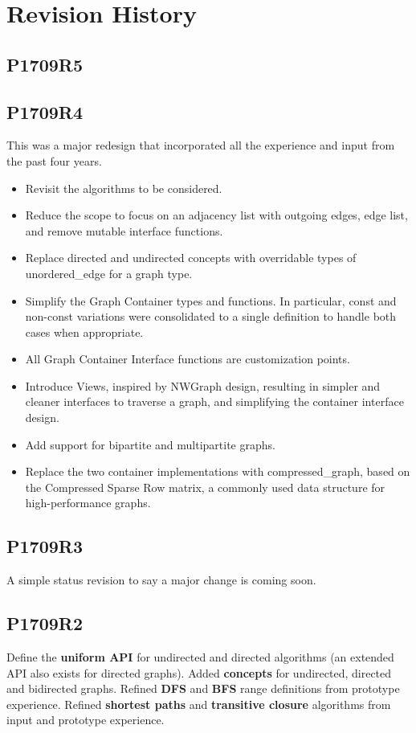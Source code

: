 \chapter*{Revision History}
\section*{P1709R5}

\section*{P1709R4}
This was a major redesign that incorporated all the experience and input from the past four years.
\begin{itemize}
\item Revisit the algorithms to be considered.
\item Reduce the scope to focus on an adjacency list with outgoing edges, edge list, and remove mutable interface functions. 
\item Replace directed and undirected concepts with overridable types of unordered\_edge for a graph type.
\item Simplify the Graph Container types and functions. In particular, const and non-const variations were consolidated to a single definition to handle both cases 
when appropriate.
\item All Graph Container Interface functions are customization points.
\item Introduce Views, inspired by NWGraph design, resulting in simpler and cleaner interfaces to traverse a graph, and simplifying the container interface design.
\item Add support for bipartite and multipartite graphs.
\item Replace the two container implementations with compressed\_graph, based on the Compressed Sparse Row matrix, a commonly used 
      data structure for high-performance graphs.
\end{itemize}

\section*{P1709R3}
A simple status revision to say a major change is coming soon.

\section*{P1709R2}
Define the \textbf{uniform API} for undirected and directed algorithms (an extended API also exists for directed graphs). Added \textbf{concepts} for undirected, directed and bidirected graphs. Refined \textbf{DFS} and \textbf{BFS} range definitions from prototype experience. Refined \textbf{shortest paths} and \textbf{transitive closure} algorithms from input and prototype experience.

